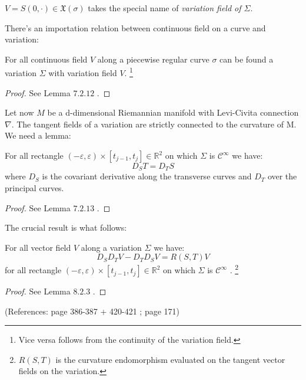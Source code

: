 \documentclass[a4paper,12pt]{scrartcl}    %
\begin{document}
\begin{notationfix}
 $V= S(0,\cdot) \in \mathfrak{X}(\sigma)$ takes the special name of \emph{variation field of $\Sigma$}.
\end{notationfix}

There's an importation relation between continuous field on a curve and variation:
\begin{proposition}
 For all continuous field $V$ along a piecewise regular curve $\sigma$ can be found a variation 
 $\Sigma$ with variation field $V$.
 \footnote{Vice versa follows from the continuity of the variation field.}
\end{proposition}
\begin{proof}
 See \cite{Abate2011} Lemma $7.2.12$ .
\end{proof}

\vspace{8mm}
Let now $M$ be a d-dimensional Riemannian manifold with Levi-Civita connection $\nabla$.
The tangent fields of a variation are strictly connected to the curvature of M.
We need a lemma:

\begin{lemma}
 For all rectangle $(-\varepsilon,\varepsilon) \times [t_{j-1}, t_j] \in \mathbb{R}^2$ 
 on which $\Sigma$ is $\mathcal{C}^{\infty}$ we have:
 \begin{displaymath}
   D_S T = D_T S
 \end{displaymath}
 where $D_S$ is the covariant derivative along the transverse curves and $D_T$ over the principal curves.
\end{lemma}
\begin{proof}
 See \cite{Abate2011} Lemma $7.2.13$ .
\end{proof}
The crucial result is what follows:
\begin{proposition}
 For all vector field $V$ along a variation $\Sigma$ we have:
 \begin{displaymath}
   D_S D_T V - D_T D_S V = R( S, T) V
 \end{displaymath}
 for all rectangle $(-\varepsilon,\varepsilon) \times [t_{j-1}, t_j] \in \mathbb{R}^2$ on which $\Sigma$ is $\mathcal{C}^{\infty}$ .
 \footnote{$ R(S, T)$ is the curvature endomorphism evaluated on the tangent vector fields on the variation.}
\end{proposition}
\begin{proof}
 See \cite{Abate2011} Lemma $8.2.3$ .
\end{proof}

 (References: \cite{Abate2011} page 386-387 + 420-421 ; \cite{Jost2005} page 171)
\end{document}
